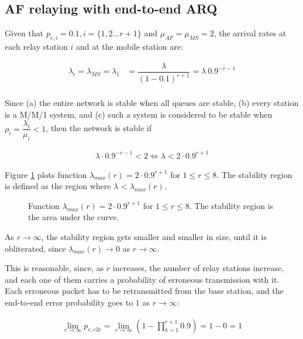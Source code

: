 \subsection{AF relaying with end-to-end ARQ}

Given that $p_{e,i} = 0.1, i = \{1,2 \dots r+1\}$ and $\mu_{AF} = \mu_{MS} = 2$,
the arrival rates at each relay station $i$ and at the mobile station are:

\begin{align*}
  \lambda_i = \lambda_{MS} = \lambda_1 &= \dfrac{\lambda}{(1-0.1)^{r+1}} = \lambda\ 0.9^{-r-1} \\
\end{align*}

Since (a) the entire network is stable when all queues are stable, (b) every
station is a M/M/1 system, and (c) such a system is considered to be stable
when $\rho_i = \dfrac{\lambda_i}{\mu_i} < 1$, then the network is stable if

\begin{align*}
  \lambda\cdot 0.9^{-r-1} < 2 \Leftrightarrow \lambda < 2\cdot 0.9^{r+1}
\end{align*}

Figure \ref{fig:04_stability_region_af_e2e} plots function
$\lambda_{max}(r) = 2 \cdot 0.9^{r+1}$ for $1 \leq r \leq 8$. The stability
region is defined as the region where $\lambda_{} < \lambda_{max}(r)$.

\begin{figure}[H]\centering
  
  \caption{Function $\lambda_{max}(r) = 2\cdot 0.9^{r+1}$ for $1 \leq r \leq 8$.
    The stability region is the area under the curve.}
  \label{fig:04_stability_region_af_e2e}
\end{figure}

As $r \to \infty$, the stability region gets smaller and smaller in size, until
it is obliterated, since $\lambda_{max}(r) \to 0$ as $r \to \infty$.

This is reasonable, since, as $r$ increases, the number of relay stations
increase, and each one of them carries a probability of erroneous transmission
with it. Each erroneous packet has to be retransmitted from the base station,
and the end-to-end error probability goes to $1$ as $r \to \infty$:

\begin{align*}
  \displaystyle \lim_{r \to \infty} p_{e,e2e} = \lim_{r \to \infty} (1 - \prod\limits_{k=1}^{r+1} 0.9) = 1 - 0 = 1
\end{align*}


